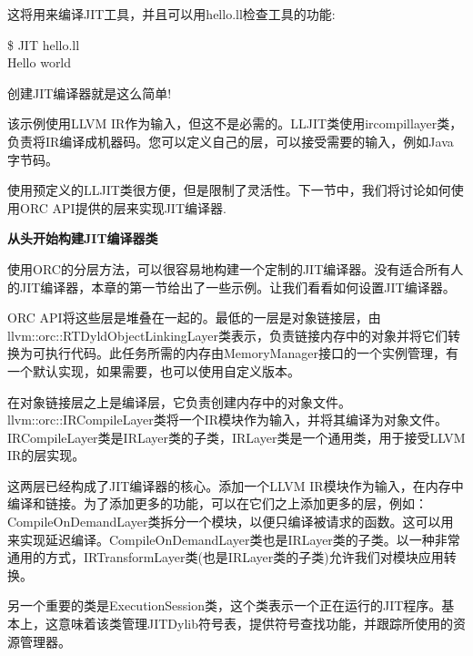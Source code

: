 这将用来编译JIT工具，并且可以用hello.ll检查工具的功能:\par

\begin{tcolorbox}[colback=white,colframe=black]
\$ JIT hello.ll \\
Hello world
\end{tcolorbox}

创建JIT编译器就是这么简单!\par

该示例使用LLVM IR作为输入，但这不是必需的。LLJIT类使用ircompillayer类，负责将IR编译成机器码。您可以定义自己的层，可以接受需要的输入，例如Java字节码。\par

使用预定义的LLJIT类很方便，但是限制了灵活性。下一节中，我们将讨论如何使用ORC API提供的层来实现JIT编译器.\par

\hspace*{\fill} \par %
\textbf{从头开始构建JIT编译器类}

使用ORC的分层方法，可以很容易地构建一个定制的JIT编译器。没有适合所有人的JIT编译器，本章的第一节给出了一些示例。让我们看看如何设置JIT编译器。\par

ORC API将这些层是堆叠在一起的。最低的一层是对象链接层，由llvm::orc::RTDyldObject\allowbreak LinkingLayer类表示，负责链接内存中的对象并将它们转换为可执行代码。此任务所需的内存由MemoryManager接口的一个实例管理，有一个默认实现，如果需要，也可以使用自定义版本。\par

在对象链接层之上是编译层，它负责创建内存中的对象文件。llvm::orc::IRCompileLayer类将一个IR模块作为输入，并将其编译为对象文件。IRCompileLayer类是IRLayer类的子类，IRLayer类是一个通用类，用于接受LLVM IR的层实现。\par

这两层已经构成了JIT编译器的核心。添加一个LLVM IR模块作为输入，在内存中编译和链接。为了添加更多的功能，可以在它们之上添加更多的层，例如：CompileOnDemandLayer类拆分一个模块，以便只编译被请求的函数。这可以用来实现延迟编译。CompileOnDemandLayer类也是IRLayer类的子类。以一种非常通用的方式，IRTransformLayer类(也是IRLayer类的子类)允许我们对模块应用转换。\par

另一个重要的类是ExecutionSession类，这个类表示一个正在运行的JIT程序。基本上，这意味着该类管理JITDylib符号表，提供符号查找功能，并跟踪所使用的资源管理器。\par

